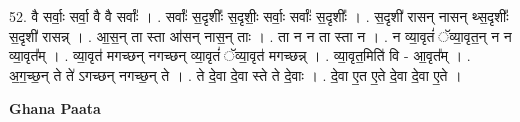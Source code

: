 \documentclass[17pt]{extarticle}
\begin{document}
52. वै सर्वाः॒ सर्वा॒ वै वै सर्वाः᳚ । . सर्वाः᳚ स॒दृशीः᳚ स॒दृशीः॒ सर्वाः॒ सर्वाः᳚ स॒दृशीः᳚ । . स॒दृशी॑ रासन् नासन् थ्स॒दृशीः᳚ स॒दृशी॑ रासन्न् । . आ॒स॒न् ता स्ता आ॑सन् नास॒न् ताः । . ता न न ता स्ता न । . न व्या॒वृतं॑ ॅव्या॒वृत॒न् न न व्या॒वृत᳚म् । . व्या॒वृत॑ मगच्छन् नगच्छन् व्या॒वृतं॑ ॅव्या॒वृत॑ मगच्छन्न् । . व्या॒वृत॒मिति॑ वि - आ॒वृत᳚म् । . अ॒ग॒च्छ॒न् ते ते॑ ऽगच्छन् नगच्छ॒न् ते । . ते दे॒वा दे॒वा स्ते ते दे॒वाः । . दे॒वा ए॒त ए॒ते दे॒वा दे॒वा ए॒ते । \newline

\textbf{Ghana Paata } \newline
\end{document}
